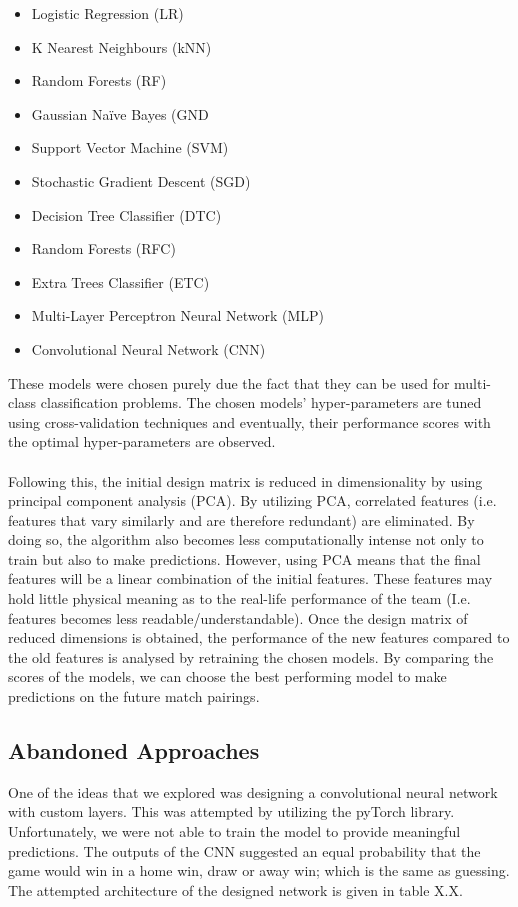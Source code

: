 \documentclass[a4paper,12pt]{article}
\begin{document}
	\begin{itemize}
		\item Logistic Regression (LR)
		\item K Nearest Neighbours (kNN)
		\item Random Forests (RF)
		\item Gaussian Naïve Bayes (GND
		\item Support Vector Machine (SVM)
		\item Stochastic Gradient Descent (SGD)
		\item Decision Tree Classifier (DTC)
		\item Random Forests (RFC)
		\item Extra Trees Classifier (ETC)
		\item Multi-Layer Perceptron Neural Network (MLP)
		\item Convolutional Neural Network (CNN)
	\end{itemize}

	These models were chosen purely due the fact that they can be used for multi-class classification problems. The chosen models' hyper-parameters are tuned using cross-validation techniques and eventually, their performance scores with the optimal hyper-parameters are observed.\\
	\\
	Following this, the initial design matrix is reduced in dimensionality by using principal component analysis (PCA). By utilizing PCA, correlated features (i.e. features that vary similarly and are therefore redundant) are eliminated. By doing so, the algorithm also becomes less computationally intense not only to train but also to make predictions. However, using PCA means that the final features will be a linear combination of the initial features. These features may hold little physical meaning as to the real-life performance of the team (I.e. features becomes less readable/understandable).
	Once the design matrix of reduced dimensions is obtained, the performance of the new features compared to the old features is analysed by retraining the chosen models. By comparing the scores of the models, we can choose the best performing model to make predictions on the future match pairings. 
	\subsection{Abandoned Approaches}
	One of the ideas that we explored was designing a convolutional neural network with custom layers. This was attempted by utilizing the pyTorch library. Unfortunately, we were not able to train the model to provide meaningful predictions. The outputs of the CNN suggested an equal probability that the game would win in a home win, draw or away win; which is the same as guessing. The attempted architecture of the designed network is given in table X.X.
	
\end{document}
